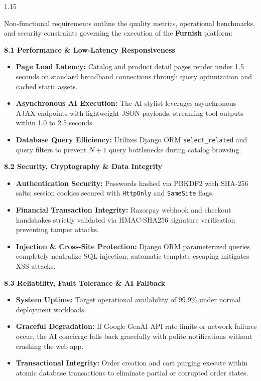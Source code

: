 \documentclass[12pt,a4paper]{article}
\begin{document}
{\fontsize{13}{18}\selectfont
\begin{spacing}{1.15}

\noindent
Non-functional requirements outline the quality metrics, operational benchmarks, and security constraints governing the execution of the \textbf{Furnish} platform:

\vspace{0.10in}

\noindent
\textbf{8.1 Performance \& Low-Latency Responsiveness}
\begin{itemize}
    \setlength{\itemsep}{1.5pt}
    \item \textbf{Page Load Latency:} Catalog and product detail pages render under 1.5 seconds on standard broadband connections through query optimization and cached static assets.
    \item \textbf{Asynchronous AI Execution:} The AI stylist leverages asynchronous AJAX endpoints with lightweight JSON payloads, streaming tool outputs within 1.0 to 2.5 seconds.
    \item \textbf{Database Query Efficiency:} Utilizes Django ORM \texttt{select\_related} and query filters to prevent $N+1$ query bottlenecks during catalog browsing.
\end{itemize}

\vspace{0.08in}

\noindent
\textbf{8.2 Security, Cryptography \& Data Integrity}
\begin{itemize}
    \setlength{\itemsep}{1.5pt}
    \item \textbf{Authentication Security:} Passwords hashed via PBKDF2 with SHA-256 salts; session cookies secured with \texttt{HttpOnly} and \texttt{SameSite} flags.
    \item \textbf{Financial Transaction Integrity:} Razorpay webhook and checkout handshakes strictly validated via HMAC-SHA256 signature verification preventing tamper attacks.
    \item \textbf{Injection \& Cross-Site Protection:} Django ORM parameterized queries completely neutralize SQL injection; automatic template escaping mitigates XSS attacks.
\end{itemize}

\vspace{0.08in}

\noindent
\textbf{8.3 Reliability, Fault Tolerance \& AI Fallback}
\begin{itemize}
    \setlength{\itemsep}{1.5pt}
    \item \textbf{System Uptime:} Target operational availability of 99.9\% under normal deployment workloads.
    \item \textbf{Graceful Degradation:} If Google GenAI API rate limits or network failures occur, the AI concierge falls back gracefully with polite notifications without crashing the web app.
    \item \textbf{Transactional Integrity:} Order creation and cart purging execute within atomic database transactions to eliminate partial or corrupted order states.
\end{itemize}


\end{spacing}}
\end{document}
